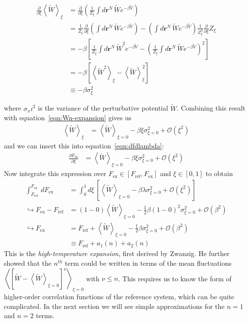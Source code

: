 \documentclass[letterpaper,twocolumn,amsmath,amssymb,prb]{revtex4-1}
\newcommand{\rr}{\ensuremath{\mathbf{r}}}
\newcommand{\Fex}{\ensuremath{F_\text{ex}}}
\newcommand{\Vtilde}{\ensuremath{\widetilde{V}}}
\newcommand{\Wtilde}{\ensuremath{\widetilde{W}}}
\begin{document}
\begin{widetext}
  \begin{align}
    \frac{\partial}{\partial\xi}\left\langle \Wtilde \right\rangle_{\xi} &= \frac{\partial}{\partial\xi}\left( \frac{1}{Z_\xi}\int d\rr^N\, \Wtilde e^{-\beta \Vtilde}\right) \nonumber \\
    &= \frac{1}{Z_\xi}\frac{\partial}{\partial\xi}\left( \int d\rr^N\, \Wtilde e^{-\beta \Vtilde} \right) - \left( \int d\rr^N\, \Wtilde e^{-\beta \Vtilde} \right)\frac{1}{Z_\xi^2}\frac{\partial}{\partial\xi}Z_\xi \nonumber \\
    &= -\beta\left[ \frac{1}{Z_\xi}\int d\rr^N\, \Wtilde^2e^{-\beta \Vtilde} - \left( \frac{1}{Z_\xi}\int d\rr^N\, \Wtilde e^{-\beta \Vtilde} \right)^2 \right] \nonumber \\
    &= -\beta\left[ \left\langle \Wtilde^2 \right\rangle_{\xi} - \left\langle \Wtilde \right\rangle_{\xi}^2 \right] \nonumber \\
    &\equiv -\beta\sigma_{\xi}^2
  \end{align}
\end{widetext}
where $\sigma_xi^2$ is the variance of the perturbative potential \Wtilde. Combining this result with equation~\ref{eqn:Wn-expansion} gives us
\begin{align}
  \left\langle \Wtilde \right\rangle_{\xi} &= \left\langle \Wtilde\right\rangle_{\xi = 0} - \beta\xi\sigma_{\xi=0}^2 + \mathcal{O}(\xi^2) \label{eqn:Wn-expansion-simplified}
\end{align}
and we can insert this into equation~\ref{eqn:dfdlambda}:
\begin{align}
  \frac{\partial \Fex}{\partial\xi} &= \left\langle \Wtilde\right\rangle_{\xi = 0} - \beta\xi\sigma_{\xi=0}^2 + \mathcal{O}(\xi^2)
\end{align}
Now integrate this expression over $\Fex\in[F_\text{ref},\Fex]$ and $\xi\in[0,1]$ to obtain
\begin{align}
  \int_{F_\text{ref}}^{\Fex}\, d\Fex &= \int_0^1 d\xi\, \left[ \left\langle \Wtilde\right\rangle_{\xi = 0} - \beta\lambda\sigma_{\xi=0}^2 + \mathcal{O}(\xi^2) \right] \nonumber \\
  \hookrightarrow \Fex - F_\text{ref} &= (1-0)\left\langle \Wtilde \right\rangle_{\xi=0} - \frac{1}{2}\beta(1 - 0)^2\sigma_{\xi=0}^2 + \mathcal{O}(\beta^2) \nonumber \\
  \hookrightarrow \Fex &= F_\text{ref} + \left\langle \Wtilde \right\rangle_{\xi=0} - \frac{1}{2}\beta\sigma_{\xi=0}^2 + \mathcal{O}(\beta^2) \label{eqn:F-inTermsW} \\
  &\equiv F_\text{ref} + a_1(n) + a_2(n)
\end{align}
This is the \emph{high-temperature expansion}, first derived by
Zwanzig\cite{Zwanzig54}. He further showed that the $n^{th}$ term could be written in
terms of the mean fluctuations $\left\langle \left[ \Wtilde - \left\langle
  \Wtilde\right\rangle_{\xi=0} \right]^\nu \right\rangle_{\xi=0}$
with $\nu \leq n$. This requires us to know the form of higher-order
correlation functions of the reference system, which can be quite
complicated. In the next section we will see simple approximations for
the $n=1$ and $n=2$ terms.
\end{document}
